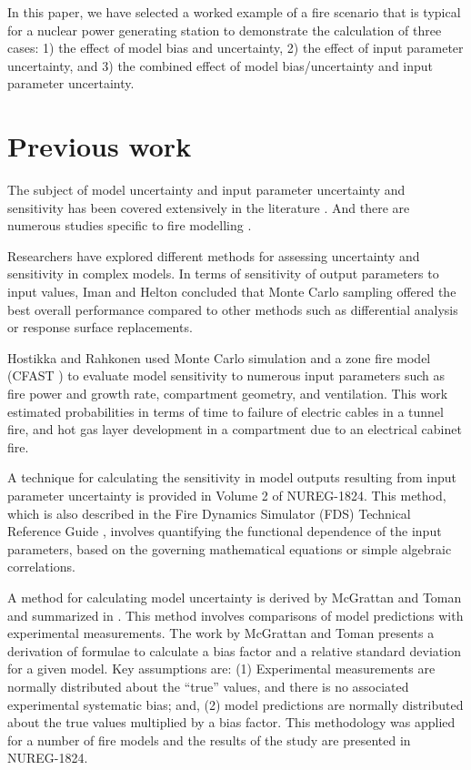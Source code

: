 \documentclass[12pt]{article}
\begin{document}
In this paper, we have selected  a worked example of a fire scenario that is typical for a nuclear power generating station to demonstrate the calculation of three cases: 1) the effect of model bias and uncertainty, 2) the effect of input parameter uncertainty, and 3) the combined effect of model bias/uncertainty and input parameter uncertainty. 


\section{Previous work}
\label{sec:previous_work}

The subject of model uncertainty and input parameter uncertainty and sensitivity has been covered extensively in the literature \cite{Spiegel, Vose, Kumamoto, Haimes}.  And there are numerous studies specific to fire modelling \cite{Notarianni:SFPE,  NUREG_1824, McGrattan2011a, Notarianni:1999, Lundin, Hostikka:2003a, Upadhyay2008, FDS_Validation_Guide}.  

Researchers have explored different methods for assessing uncertainty and sensitivity in complex models. In terms of sensitivity of output parameters to input values, Iman and Helton \cite{Iman:1988} concluded that Monte Carlo sampling offered the best overall performance compared to other methods such as differential analysis or response surface replacements.

Hostikka and Rahkonen \cite{Hostikka:2003a} used Monte Carlo simulation and a zone fire model (CFAST \cite{CFAST_Tech_Guide_6, CFAST_Users_Guide_6}) to evaluate model sensitivity to numerous  input parameters such as fire power and growth rate, compartment geometry, and ventilation. This work estimated probabilities in terms of time to failure of electric cables in a tunnel fire, and hot gas layer development  in a compartment due to an electrical cabinet fire. 

A technique for calculating the sensitivity in model outputs resulting  from input parameter uncertainty is provided in Volume 2 of NUREG-1824. This method, which is also described in the Fire Dynamics Simulator (FDS) Technical Reference Guide \cite{FDS_Validation_Guide}, involves quantifying the functional dependence of the input parameters, based on the governing mathematical equations or simple algebraic correlations. 

A method for calculating model uncertainty is derived by McGrattan and Toman \cite{McGrattan2011a} and summarized in \cite{FDS_Validation_Guide}. This method involves comparisons of model predictions with experimental measurements. The work by McGrattan and Toman presents a derivation of formulae to calculate  a bias factor and a relative standard deviation for a given model. Key assumptions are: (1) Experimental measurements are normally distributed about the ``true'' values, and there is no associated experimental systematic bias; and, (2)  model predictions are normally distributed about the true values multiplied by a bias factor. This methodology was applied for a number of fire models and the results of the study are presented in NUREG-1824.
\end{document}
